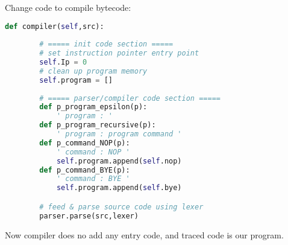 Change code to compile bytecode:
\begin{lstlisting}[language=python]
	def compiler(self,src):	
	
		# ===== init code section =====
		# set instruction pointer entry point
		self.Ip = 0							
		# clean up program memory
		self.program = []
		
		# ===== parser/compiler code section =====
		def p_program_epsilon(p):
			' program : '
		def p_program_recursive(p):
			' program : program command '
		def p_command_NOP(p):
			' command : NOP '
			self.program.append(self.nop)
		def p_command_BYE(p):
			' command : BYE '
			self.program.append(self.bye)

		# feed & parse source code using lexer
		parser.parse(src,lexer)				
\end{lstlisting}

Now compiler does no add any entry code, and traced code is our program.
